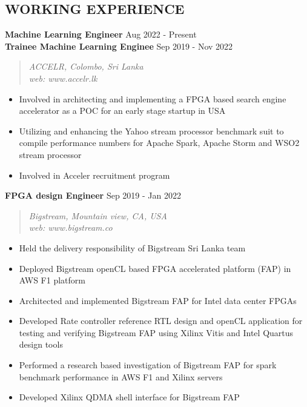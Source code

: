 \documentclass[mm]{res} %
\begin{document}
\begin{resume}

\section{WORKING EXPERIENCE}

\textbf{Machine Learning Engineer} \hfill Aug 2022 - Present\\
\textbf{Trainee Machine Learning Enginee} \hfill Sep 2019 - Nov 2022
\begin{quote}
	\emph{ACCELR, Colombo, Sri Lanka \\
		web: www.accelr.lk}
\end{quote}
\begin{itemize} \itemsep -1pt 
\item Involved in architecting and implementing a FPGA based search engine accelerator as a POC for an early stage startup in USA
\item Utilizing and enhancing the Yahoo stream processor benchmark suit to compile performance numbers for  Apache Spark, Apache Storm and WSO2 stream processor
\item Involved in Acceler recruitment program
\end{itemize}
\textbf{FPGA design Engineer} \hfill Sep 2019 - Jan 2022
\begin{quote}
	\emph{Bigstream, Mountain view, CA, USA\\
		  web: www.bigstream.co}
\end{quote}
\begin{itemize} \itemsep -1pt 
	\item Held the delivery responsibility of Bigstream Sri Lanka team
	\item Deployed Bigstream openCL based FPGA accelerated platform (FAP) in AWS F1 platform
	\item Architected and implemented Bigstream FAP for Intel data center FPGAs
	\item Developed Rate controller reference RTL design and openCL application for testing and verifying Bigstream FAP using Xilinx Vitis and Intel Quartus design tools
	\item Performed a research based investigation of Bigstream FAP for spark benchmark performance in AWS F1 and Xilinx servers
	\item Developed Xilinx QDMA shell interface for Bigstream FAP

\end{itemize}
\end{resume}
\end{document}
